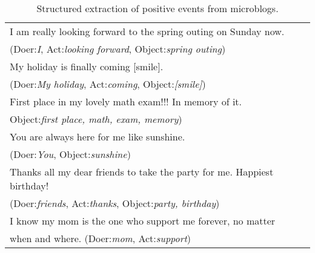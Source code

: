 \linespread{1.1}
\begin{table}[H]
\begin{center}
\caption{\small{Structured extraction of positive events from microblogs.}}
\small{
\begin{tabular}{l} \hline \rowcolor{gray!40}
I am really looking forward to the spring outing on Sunday now. \\ \rowcolor{gray!40}
(Doer:\emph{I}, Act:\emph{looking forward}, Object:\emph{spring outing})\\
My holiday is finally coming [smile]. \\
(Doer:\emph{My holiday}, Act:\emph{coming}, Object:\emph{[smile]})\\ \rowcolor{gray!40}%
First place in my lovely math exam!!! In memory of it.\\ \rowcolor{gray!40}
Object:\emph{first place, math, exam, memory})\\ %
You are always here for me like sunshine. \\
(Doer:\emph{You}, Object:\emph{sunshine})\\ \rowcolor{gray!40} %
Thanks all my dear friends to take the party for me. Happiest birthday!\\ \rowcolor{gray!40}
(Doer:\emph{friends}, Act:\emph{thanks}, Object:\emph{party, birthday})\\
I know my mom is the one who support me forever, no matter \\ %
when and where. (Doer:\emph{mom}, Act:\emph{support})\\ \hline
\end{tabular}}
\label{tab:uplifts}
\end{center}
\end{table}

